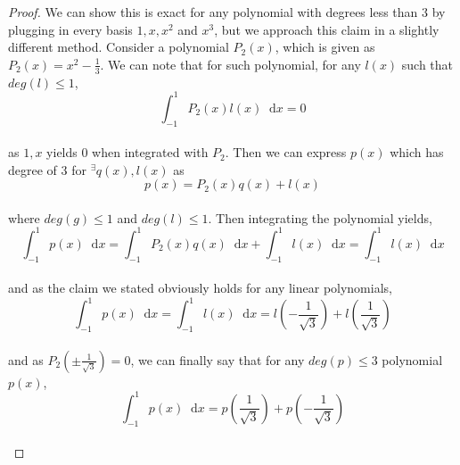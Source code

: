 \documentclass[paper=a4, fontsize=11pt]{scrartcl}
\newcommand*\dif{\mathop{}\!\mathrm{d}}
\begin{document}
\begin{proof}
	We can show this is exact for any polynomial with degrees less than 3 by plugging in every basis $1,x,x^2$ and $x^3$, but we approach this claim in a slightly different method. Consider a polynomial $P_2(x)$, which is given as $P_2(x)=x^2 - \frac{1}{3}$. We can note that for such polynomial, for any $l(x)$ such that $deg(l)\leq 1$, \\
	
	\begin{equation}\nonumber
		\int_{-1}^{1} P_2(x) l(x) \dif x = 0
	\end{equation}\\
	
	as $1,x$ yields 0 when integrated with $P_2$. Then we can express $p(x)$ which has degree of 3 for $^\exists q(x) ,l(x)$ as \\
	
	\begin{equation}\nonumber
		p(x) = P_2(x)q(x) + l(x)
	\end{equation}\\
	
	where $deg(g) \leq 1$ and $deg(l) \leq 1$. Then integrating the polynomial yields, \\
	
	\begin{equation}\nonumber
		\int_{-1}^{1} p(x) \dif x = \int_{-1}^{1}  P_2(x)q(x) \dif x  + \int_{-1}^{1}l(x) \dif x = \int_{-1}^{1} l(x) \dif x
	\end{equation}\\
	
	and as the claim we stated obviously holds for any linear polynomials, \\
	
	\begin{equation}\nonumber
			\int_{-1}^{1} p(x) \dif x =  \int_{-1}^{1} l(x) \dif x = l\left(-\frac{1}{\sqrt{3}}\right) + l\left( \frac{1}{\sqrt{3}}\right)
	\end{equation}\\
	
	and as $P_2\left(\pm \frac{1}{\sqrt{3}} \right) =0 $, we can finally say that for any $deg(p)\leq 3$ polynomial $p(x)$, \\
	
	\begin{equation}\nonumber
		\int_{-1}^{1} p(x) \dif x = p\left( \frac{1}{\sqrt{3}} \right) + p\left(- \frac{1}{\sqrt{3}} \right)
	\end{equation}\\
\end{proof}
\end{document}
